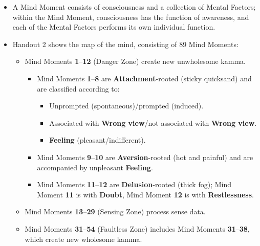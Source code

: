 \begin{itemize}

\item A Mind Moment consists of consciousness and a collection of Mental Factors; within the Mind Moment, consciousness has the function of awareness, and each of the Mental Factors performs its own individual function.

\pagebreak

\item Handout 2 shows the map of the mind, consisting of 89 Mind Moments:

\begin{itemize}

\item Mind Moments \textbf{1}--\textbf{12} (Danger Zone) create new unwholesome kamma.

\begin{itemize}

\item Mind Moments \textbf{1}--\textbf{8} are \textbf{Attachment}-rooted (sticky quicksand) and are classified according to:

\begin{itemize}

\item Unprompted (spontaneous)/prompted (induced).

\item Associated with \textbf{Wrong view}/not associated with \textbf{Wrong view}.

\item \textbf{Feeling} (pleasant/indifferent).

\end{itemize}

\item Mind Moments \textbf{9}--\textbf{10} are \textbf{Aversion}-rooted (hot and painful) and are accompanied by unpleasant \textbf{Feeling}.

\item Mind Moments \textbf{11}--\textbf{12} are \textbf{Delusion}-rooted (thick fog); Mind Moment \textbf{11} is with \textbf{Doubt}, Mind Moment \textbf{12} is with \textbf{Restlessness}.

\end{itemize}

\item Mind Moments \textbf{13}--\textbf{29} (Sensing Zone) process sense data.

\item Mind Moments \textbf{31}--\textbf{54} (Faultless Zone) includes Mind Moments \textbf{31}--\textbf{38}, which create new wholesome kamma.


\end{itemize}
\end{itemize}
